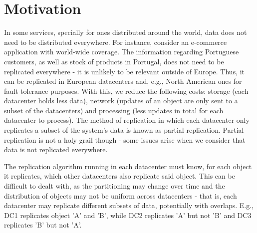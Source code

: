 
\section{Motivation}
In some services, specially for ones distributed around the world, data does not need to be distributed everywhere.
For instance, consider an e-commerce application with world-wide coverage.
The information regarding Portuguese customers, as well as stock of products in Portugal, does not need to be replicated everywhere - it is unlikely to be relevant outside of Europe.
Thus, it can be replicated in European datacenters and, e.g., North American ones for fault tolerance purposes.
With this, we reduce the following costs: storage (each datacenter holds less data), network (updates of an object are only sent to a subset of the datacenters) and processing (less updates in total for each datacenter to process).
The method of replication in which each datacenter only replicates a subset of the system's data is known as partial replication.
Partial replication is not a holy grail though - some issues arise when we consider that data is not replicated everywhere.

The replication algorithm running in each datacenter must know, for each object it replicates, which other datacenters also replicate said object.
This can be difficult to dealt with, as the partitioning may change over time and the distribution of objects may not be uniform across datacenters - that is, each datacenter may replicate different subsets of data, potentially with overlaps.
E.g., DC1 replicates object 'A' and 'B', while DC2 replicates 'A' but not 'B' and DC3 replicates 'B' but not 'A'.

